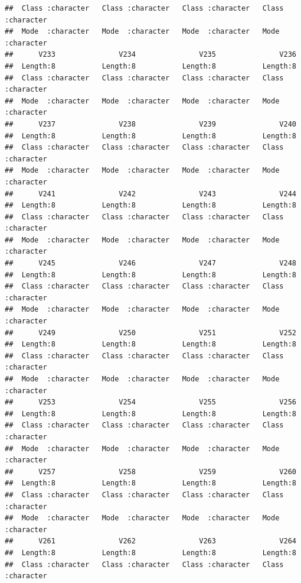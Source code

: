 \documentclass[
]{article}
\begin{document}
\begin{verbatim}
##  Class :character   Class :character   Class :character   Class :character  
##  Mode  :character   Mode  :character   Mode  :character   Mode  :character  
##      V233               V234               V235               V236          
##  Length:8           Length:8           Length:8           Length:8          
##  Class :character   Class :character   Class :character   Class :character  
##  Mode  :character   Mode  :character   Mode  :character   Mode  :character  
##      V237               V238               V239               V240          
##  Length:8           Length:8           Length:8           Length:8          
##  Class :character   Class :character   Class :character   Class :character  
##  Mode  :character   Mode  :character   Mode  :character   Mode  :character  
##      V241               V242               V243               V244          
##  Length:8           Length:8           Length:8           Length:8          
##  Class :character   Class :character   Class :character   Class :character  
##  Mode  :character   Mode  :character   Mode  :character   Mode  :character  
##      V245               V246               V247               V248          
##  Length:8           Length:8           Length:8           Length:8          
##  Class :character   Class :character   Class :character   Class :character  
##  Mode  :character   Mode  :character   Mode  :character   Mode  :character  
##      V249               V250               V251               V252          
##  Length:8           Length:8           Length:8           Length:8          
##  Class :character   Class :character   Class :character   Class :character  
##  Mode  :character   Mode  :character   Mode  :character   Mode  :character  
##      V253               V254               V255               V256          
##  Length:8           Length:8           Length:8           Length:8          
##  Class :character   Class :character   Class :character   Class :character  
##  Mode  :character   Mode  :character   Mode  :character   Mode  :character  
##      V257               V258               V259               V260          
##  Length:8           Length:8           Length:8           Length:8          
##  Class :character   Class :character   Class :character   Class :character  
##  Mode  :character   Mode  :character   Mode  :character   Mode  :character  
##      V261               V262               V263               V264          
##  Length:8           Length:8           Length:8           Length:8          
##  Class :character   Class :character   Class :character   Class :character  

\end{verbatim}
\end{document}
